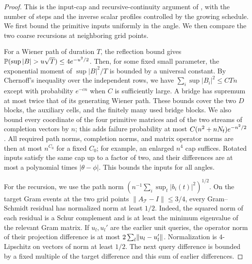 \begin{proof}
This is the input-cap and recursive-continuity argument of
\cite[Section~6, proof of Proposition~7]{oai-typical-upper}, with the
number of steps and the inverse scalar profiles controlled by the
growing schedule.
We first bound the primitive inputs uniformly in the angle. We then
compare the two coarse recursions at neighboring grid points.

For a Wiener path of duration $T$, the reflection bound gives
$\PP(\sup|B|>u\sqrt T)\le4e^{-u^2/2}$. Then, for some fixed small parameter, the exponential moment of
$\sup|B|^2/T$ is bounded by a universal constant. By Chernoff's inequality
over the independent rows, we have
$\sum_i\sup|B_i|^2\le CTn$ except with probability $e^{-cn}$ when $C$
is sufficiently large. A bridge has supremum at most twice that of its
generating Wiener path. These bounds cover the two $D$ blocks, the
auxiliary cells, and the finitely many used bridge blocks. We also bound
every coordinate of the four primitive matrices and of the two streams of
completion vectors by $n$; this adds failure probability at most
$C(n^2+nN_{\mathsf{f}})e^{-n^2/2}$. All required path norms, completion norms,
and matrix operator norms are then at most $n^{C_0}$ for a fixed $C_0$;
for example, an enlarged $n^4$ cap suffices. Rotated inputs satisfy the
same cap up to a factor of two, and their differences are at most a
polynomial times $|\theta-\phi|$. This bounds the inputs for all angles.

For the recursion, we use the path norm
$(n^{-1}\sum_i\sup_t|b_i(t)|^2)^{1/2}$. On the target Gram events at the two grid points
$\|A_{\mathcal T}-I\|\le3/4$, every Gram--Schmidt residual has normalized
norm at least $1/2$. Indeed, the squared norm of each residual is a Schur complement
and is at least the minimum eigenvalue of the relevant Gram matrix.
If $u_l,u_l'$ are the earlier unit queries, the operator norm of their
projection difference is at most $2\sum_l\lVert u_l-u_l'\rVert$.
Normalization is $4$-Lipschitz on vectors of norm at least $1/2$.
The next query difference is bounded by a fixed multiple of the target
difference and this sum of earlier differences.


\end{proof}

